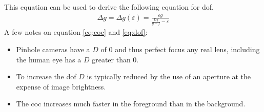 This equation can be used to derive the following equation for \gls{dof}.
\begin{align}
    \Delta g = \Delta g(\varepsilon) = \frac{\varepsilon g}{\frac{D f}{g-f} - \varepsilon}
    \label{eq:dof}
\end{align}
A few notes on equation \ref{eq:coc} and \ref{eq:dof}:
\begin{itemize}
    \item Pinhole cameras have a $D$ of 0 and thus perfect focus any real lens, including the human eye has a $D$ greater than 0.
    \item To increase the \gls{dof} $D$ is typically reduced by the use of an aperture at the expense of image brightness.
    \item The \gls{coc} increases much faster in the foreground than in the background.
\end{itemize}







